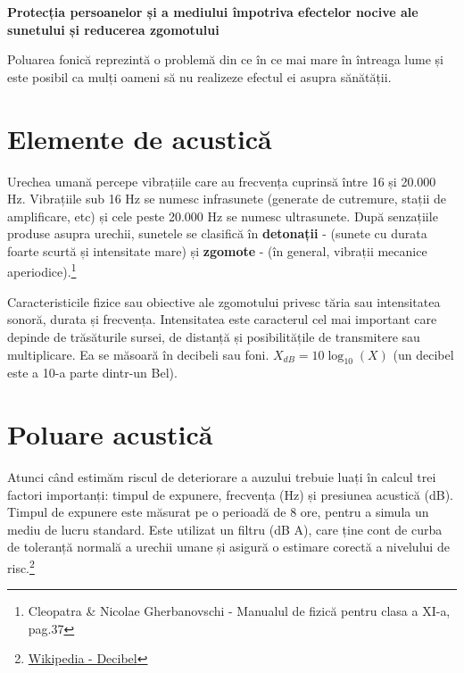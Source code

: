 





\textbf{\LARGE Protecția persoanelor și a mediului împotriva efectelor nocive ale sunetului și reducerea zgomotului
}

\vspace{0.5cm}
Poluarea fonică reprezintă o problemă din ce în ce mai mare în întreaga lume și este posibil ca mulți oameni să nu realizeze efectul ei asupra sănătății.

\section{Elemente de acustică}

\quad Urechea umană percepe vibrațiile care au frecvența cuprinsă între 16 și 20.000 Hz. Vibrațiile sub 16 Hz se numesc infrasunete (generate de cutremure, stații de amplificare, etc) și cele peste 20.000 Hz se numesc ultrasunete. După senzațiile produse asupra urechii, sunetele se clasifică în \textbf{detonații} - (sunete cu durata foarte scurtă și intensitate mare) și \textbf{zgomote} - (în general, vibrații mecanice aperiodice).\footnote{Cleopatra \& Nicolae Gherbanovschi - Manualul de fizică pentru clasa a XI-a, pag.37}

Caracteristicile fizice sau obiective ale zgomotului privesc tăria sau intensitatea sonoră, durata și frecvența. Intensitatea este caracterul cel mai important care depinde de trăsăturile sursei, de distanță și posibilitățile de transmitere sau multiplicare. Ea se măsoară în decibeli sau foni. ${\displaystyle X_{dB}=10\log _{10}(X)}$ (un decibel este a 10-a parte dintr-un Bel).

\section{Poluare acustică}

\quad Atunci când estimăm riscul de deteriorare a auzului trebuie luați în calcul trei factori importanți: timpul de expunere, frecvența (Hz) și presiunea acustică (dB). Timpul de expunere este măsurat pe o perioadă de 8 ore, pentru a simula un mediu de lucru standard. Este utilizat un filtru (dB A), care ține cont de curba de toleranță normală a urechii umane și asigură o estimare corectă a nivelului de risc.\footnote{\href{https://ro.wikipedia.org/wiki/Decibel}{Wikipedia - Decibel}}

